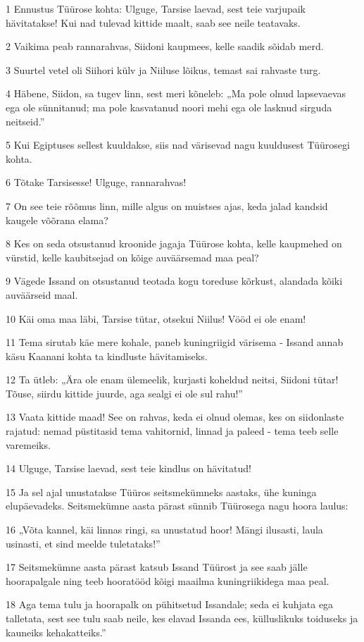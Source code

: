 \par 1 Ennustus Tüürose kohta: Ulguge, Tarsise laevad, sest teie varjupaik hävitatakse! Kui nad tulevad kittide maalt, saab see neile teatavaks.
\par 2 Vaikima peab rannarahvas, Siidoni kaupmees, kelle saadik sõidab merd.
\par 3 Suurtel vetel oli Siihori külv ja Niiluse lõikus, temast sai rahvaste turg.
\par 4 Häbene, Siidon, sa tugev linn, sest meri kõneleb: „Ma pole olnud lapsevaevas ega ole sünnitanud; ma pole kasvatanud noori mehi ega ole lasknud sirguda neitseid.”
\par 5 Kui Egiptuses sellest kuuldakse, siis nad värisevad nagu kuuldusest Tüürosegi kohta.
\par 6 Tõtake Tarsisesse! Ulguge, rannarahvas!
\par 7 On see teie rõõmus linn, mille algus on muistses ajas, keda jalad kandsid kaugele võõrana elama?
\par 8 Kes on seda otsustanud kroonide jagaja Tüürose kohta, kelle kaupmehed on vürstid, kelle kaubitsejad on kõige auväärsemad maa peal?
\par 9 Vägede Issand on otsustanud teotada kogu toreduse kõrkust, alandada kõiki auväärseid maal.
\par 10 Käi oma maa läbi, Tarsise tütar, otsekui Niilus! Vööd ei ole enam!
\par 11 Tema sirutab käe mere kohale, paneb kuningriigid värisema - Issand annab käsu Kaanani kohta ta kindluste hävitamiseks.
\par 12 Ta ütleb: „Ära ole enam ülemeelik, kurjasti koheldud neitsi, Siidoni tütar! Tõuse, siirdu kittide juurde, aga sealgi ei ole sul rahu!”
\par 13 Vaata kittide maad! See on rahvas, keda ei olnud olemas, kes on siidonlaste rajatud: nemad püstitasid tema vahitornid, linnad ja paleed - tema teeb selle varemeiks.
\par 14 Ulguge, Tarsise laevad, sest teie kindlus on hävitatud!
\par 15 Ja sel ajal unustatakse Tüüros seitsmekümneks aastaks, ühe kuninga elupäevadeks. Seitsmekümne aasta pärast sünnib Tüürosega nagu hoora laulus:
\par 16 „Võta kannel, käi linnas ringi, sa unustatud hoor! Mängi ilusasti, laula usinasti, et sind meelde tuletataks!”
\par 17 Seitsmekümne aasta pärast katsub Issand Tüürost ja see saab jälle hoorapalgale ning teeb hooratööd kõigi maailma kuningriikidega maa peal.
\par 18 Aga tema tulu ja hoorapalk on pühitsetud Issandale; seda ei kuhjata ega talletata, sest see tulu saab neile, kes elavad Issanda ees, külluslikuks toiduseks ja kauneiks kehakatteiks.”

